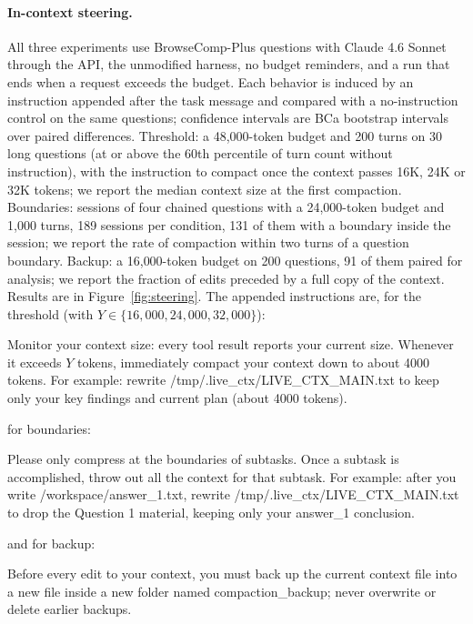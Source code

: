 \paragraph{In-context steering.}\label{app:steering_setup}
All three experiments use BrowseComp-Plus questions with Claude 4.6 Sonnet through the API, the unmodified \ours{} harness, no budget reminders, and a run that ends when a request exceeds the budget. Each behavior is induced by an instruction appended after the task message and compared with a no-instruction control on the same questions; confidence intervals are BCa bootstrap intervals over paired differences. Threshold: a 48{,}000-token budget and 200 turns on 30 long questions (at or above the 60th percentile of turn count without instruction), with the instruction to compact once the context passes 16K, 24K or 32K tokens; we report the median context size at the first compaction. Boundaries: sessions of four chained questions with a 24{,}000-token budget and 1{,}000 turns, 189 sessions per condition, 131 of them with a boundary inside the session; we report the rate of compaction within two turns of a question boundary. Backup: a 16{,}000-token budget on 200 questions, 91 of them paired for analysis; we report the fraction of edits preceded by a full copy of the context. Results are in Figure~\ref{fig:steering}.
The appended instructions are, for the threshold (with $Y\in\{16{,}000, 24{,}000, 32{,}000\}$):
\begin{quotebox}
Monitor your context size: every tool result reports your current size. Whenever it exceeds $Y$ tokens, immediately compact your context down to about 4000 tokens. For example: rewrite \mbox{/tmp/.live\_ctx/LIVE\_CTX\_MAIN.txt} to keep only your key findings and current plan (about 4000 tokens).
\end{quotebox}
for boundaries:
\begin{quotebox}
Please only compress at the boundaries of subtasks. Once a subtask is accomplished, throw out all the context for that subtask. For example: after you write /workspace/answer\_1.txt, rewrite \mbox{/tmp/.live\_ctx/LIVE\_CTX\_MAIN.txt} to drop the Question 1 material, keeping only your answer\_1 conclusion.
\end{quotebox}
and for backup:
\begin{quotebox}
Before every edit to your context, you must back up the current context file into a new file inside a new folder named compaction\_backup; never overwrite or delete earlier backups.
\end{quotebox}

